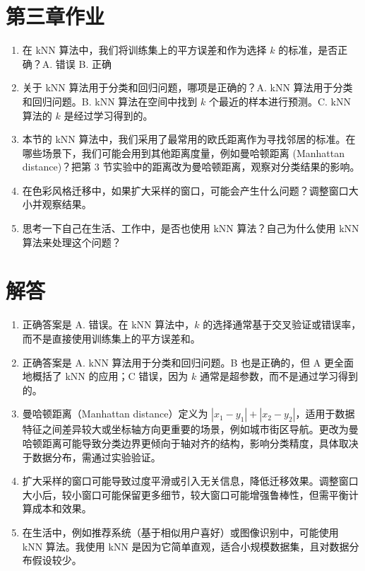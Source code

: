 \documentclass[a4paper,12pt]{book}
\begin{document}
\section*{第三章作业}

\begin{enumerate}
    \item 在 kNN 算法中，我们将训练集上的平方误差和作为选择 $k$ 的标准，是否正确？A. 错误 B. 正确
    \item 关于 kNN 算法用于分类和回归问题，哪项是正确的？A. kNN 算法用于分类和回归问题。B. kNN 算法在空间中找到 $k$ 个最近的样本进行预测。C. kNN 算法的 $k$ 是经过学习得到的。
    \item 本节的 kNN 算法中，我们采用了最常用的欧氏距离作为寻找邻居的标准。在哪些场景下，我们可能会用到其他距离度量，例如曼哈顿距离 (Manhattan distance)？把第 3 节实验中的距离改为曼哈顿距离，观察对分类结果的影响。
    \item 在色彩风格迁移中，如果扩大采样的窗口，可能会产生什么问题？调整窗口大小并观察结果。
    \item 思考一下自己在生活、工作中，是否也使用 kNN 算法？自己为什么使用 kNN 算法来处理这个问题？
\end{enumerate}

\section*{解答}

\begin{enumerate}
    \item 正确答案是 A. 错误。在 kNN 算法中，$k$ 的选择通常基于交叉验证或错误率，而不是直接使用训练集上的平方误差和。
    \item 正确答案是 A. kNN 算法用于分类和回归问题。B 也是正确的，但 A 更全面地概括了 kNN 的应用；C 错误，因为 $k$ 通常是超参数，而不是通过学习得到的。
    \item 曼哈顿距离（Manhattan distance）定义为 $|x_1 - y_1| + |x_2 - y_2|$，适用于数据特征之间差异较大或坐标轴方向更重要的场景，例如城市街区导航。更改为曼哈顿距离可能导致分类边界更倾向于轴对齐的结构，影响分类精度，具体取决于数据分布，需通过实验验证。
    \item 扩大采样的窗口可能导致过度平滑或引入无关信息，降低迁移效果。调整窗口大小后，较小窗口可能保留更多细节，较大窗口可能增强鲁棒性，但需平衡计算成本和效果。
    \item 在生活中，例如推荐系统（基于相似用户喜好）或图像识别中，可能使用 kNN 算法。我使用 kNN 是因为它简单直观，适合小规模数据集，且对数据分布假设较少。
\end{enumerate}
\end{document}
